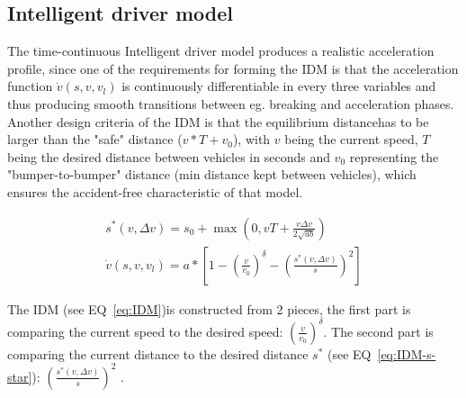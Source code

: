         \subsection{Intelligent driver model}\label{subsec:intelligent-driver-model}
            The time-continuous Intelligent driver model produces a realistic acceleration profile, since one of the requirements for forming the IDM is that the acceleration function $\dot{v}(s,v,v_l)$ is continuously differentiable in every three variables and thus producing smooth transitions between eg. breaking and acceleration phases.
            Another design criteria of the IDM is that the equilibrium distance\footnotemark has to be larger than the "safe" distance ($v*T + v_0$), with $v$ being the current speed, $T$ being the desired distance between vehicles in seconds and $v_0$ representing the "bumper-to-bumper" distance (min distance kept between vehicles), which ensures the accident-free characteristic of that model.

            \begin{align}
                s^*(v,\Delta v) = s_0 + \max\left( 0, vT + \frac{v \Delta v}{2 \sqrt{ab}} \right) \label{eq:IDM-s-star} \\
                \dot{v}(s,v,v_l) = a * \left[ 1- \left(\frac{v}{v_0}\right)^\delta  - \left( \frac{s^*(v, \Delta v)}{s} \right)^2\right] \label{eq:IDM}
            \end{align}

            The IDM (see EQ~\ref{eq:IDM})is constructed from 2 pieces, the first part is comparing the current speed to the desired speed: $\left(\frac{v}{v_0}\right)^\delta$.
            The second part is comparing the current distance to the desired distance $s^*$ (see EQ~\ref{eq:IDM-s-star}): $\left( \frac{s^*(v, \Delta v)}{s} \right)^2$ \cite{treiber2013traffic, treiber2000IDM}.

